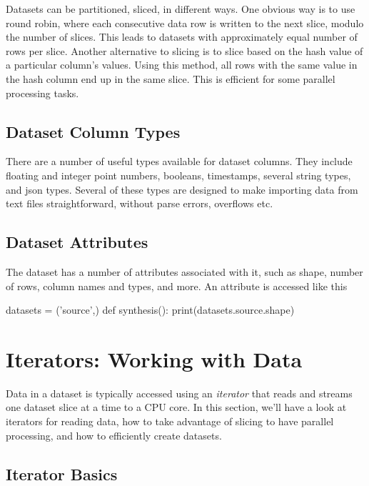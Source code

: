 Datasets can be partitioned, sliced, in different ways.  One obvious
way is to use round robin, where each consecutive data row is written
to the next slice, modulo the number of slices.  This leads to
datasets with approximately equal number of rows per slice.  Another
alternative to slicing is to slice based on the hash value of a
particular column's values.  Using this method, all rows with the same
value in the hash column end up in the same slice.  This is efficient
for some parallel processing tasks.




\subsection{Dataset Column Types}
\label{sec:dataset-typing}
There are a number of useful types available for dataset columns.
They include floating and integer point numbers, booleans, timestamps,
several string types, and json types.  Several of these types are
designed to make importing data from text files straightforward,
without parse errors, overflows etc.



\subsection{Dataset Attributes}
The dataset has a number of attributes associated with it, such as
shape, number of rows, column names and types, and more.
An attribute is accessed like this
\begin{python}
datasets = ('source',)
def synthesis():
    print(datasets.source.shape)
\end{python}




\clearpage
\section{Iterators: Working with Data}

Data in a dataset is typically accessed using an \emph{iterator} that
reads and streams one dataset slice at a time to a CPU core.  In this
section, we'll have a look at iterators for reading data, how to take
advantage of slicing to have parallel processing, and how to
efficiently create datasets.

\subsection{Iterator Basics}

